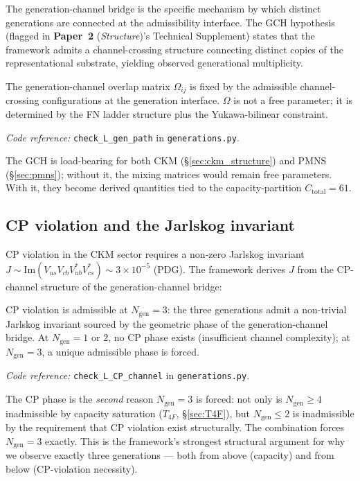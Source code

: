 \documentclass[11pt]{article}
\newcommand{\coderef}[2]{\smallskip\noindent\textit{Code reference:} \texttt{#1} in \texttt{#2}.}
\newcommand{\epitag}[1]{\textbf{[#1]}}
\newcommand{\paperref}[2]{\textbf{Paper~#1} (\textit{#2})}
\theoremstyle{definition}
\begin{document}
The generation-channel bridge is the specific mechanism by which distinct generations are connected at the admissibility interface. The GCH hypothesis (flagged in \paperref{2}{Structure}'s Technical Supplement) states that the framework admits a channel-crossing structure connecting distinct copies of the representational substrate, yielding observed generational multiplicity.

\begin{tcolorbox}[apfbox, title={$L_{\mathrm{gen\_path}}$ (generation-channel bridge) \epitag{P\_structural}}]
The generation-channel overlap matrix $\Omega_{ij}$ is fixed by the admissible channel-crossing configurations at the generation interface. $\Omega$ is not a free parameter; it is determined by the FN ladder structure plus the Yukawa-bilinear constraint.
\end{tcolorbox}

\coderef{check\_L\_gen\_path}{generations.py}

The GCH is load-bearing for both CKM (\S\ref{sec:ckm_structure}) and PMNS (\S\ref{sec:pmns}); without it, the mixing matrices would remain free parameters. With it, they become derived quantities tied to the capacity-partition $C_{\mathrm{total}} = 61$.

\subsection{CP violation and the Jarlskog invariant}\label{sec:cp_violation}

CP violation in the CKM sector requires a non-zero Jarlskog invariant $J \sim \mathrm{Im}(V_{us} V_{cb} V_{ub}^* V_{cs}^*) \sim 3 \times 10^{-5}$ (PDG). The framework derives $J$ from the CP-channel structure of the generation-channel bridge:

\begin{tcolorbox}[apfbox, title={$L_{\mathrm{CP\_channel}}$ \epitag{P\_structural}}]
CP violation is admissible at $N_{\mathrm{gen}} = 3$: the three generations admit a non-trivial Jarlskog invariant sourced by the geometric phase of the generation-channel bridge. At $N_{\mathrm{gen}} = 1$ or $2$, no CP phase exists (insufficient channel complexity); at $N_{\mathrm{gen}} = 3$, a unique admissible phase is forced.
\end{tcolorbox}

\coderef{check\_L\_CP\_channel}{generations.py}

The CP phase is the \emph{second} reason $N_{\mathrm{gen}} = 3$ is forced: not only is $N_{\mathrm{gen}} \geq 4$ inadmissible by capacity saturation ($T_{4F}$, \S\ref{sec:T4F}), but $N_{\mathrm{gen}} \leq 2$ is inadmissible by the requirement that CP violation exist structurally. The combination forces $N_{\mathrm{gen}} = 3$ exactly. This is the framework's strongest structural argument for why we observe exactly three generations --- both from above (capacity) and from below (CP-violation necessity).
\end{document}
